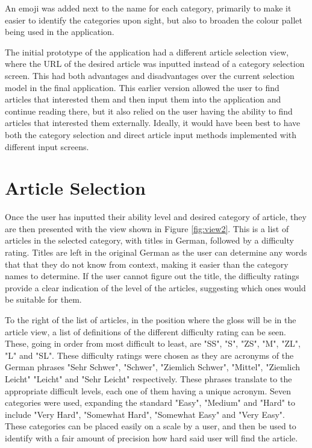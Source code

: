 An emoji was added next to the name for each category, primarily to make it easier to identify the categories upon sight, but also to broaden the colour pallet being used in the application.

The initial prototype of the application had a different article selection view, where the URL of the desired article was inputted instead of a category selection screen. This had both advantages and disadvantages over the current selection model in the final application. This earlier version allowed the user to find articles that interested them and then input them into the application and continue reading there, but it also relied on the user having the ability  to find articles that interested them externally. Ideally, it would have been best to have both the category selection and direct article input methods implemented with different input screens.

\section{Article Selection}

Once the user has inputted their ability level and desired category of article, they are then presented with the view shown in Figure \ref{fig:view2}. This is a list of articles in the selected category, with titles in German, followed by a difficulty rating. Titles are left in the original German as the user can determine any words that that they do not know from context, making it easier than the category names to determine. If the user cannot figure out the title, the difficulty ratings provide a clear indication of the level of the articles, suggesting which ones would be suitable for them. 



To the right of the list of articles, in the position where the gloss will be in the article view, a list of definitions of the different difficulty rating can be seen. These, going in order from most difficult to least, are "SS", "S", "ZS", "M", "ZL", "L" and "SL". These difficulty ratings were chosen as they are acronyms of the German phrases "Sehr Schwer", "Schwer", "Ziemlich Schwer", "Mittel", "Ziemlich Leicht" "Leicht" and "Sehr Leicht" respectively. These phrases translate to the appropriate difficult levels, each one of them having a unique acronym. Seven categories were used, expanding the standard "Easy", "Medium" and "Hard" to include "Very Hard", "Somewhat Hard", "Somewhat Easy" and "Very Easy". These categories can be placed easily on a scale by a user, and then be used to identify with a fair amount of precision how hard said user will find the article.

